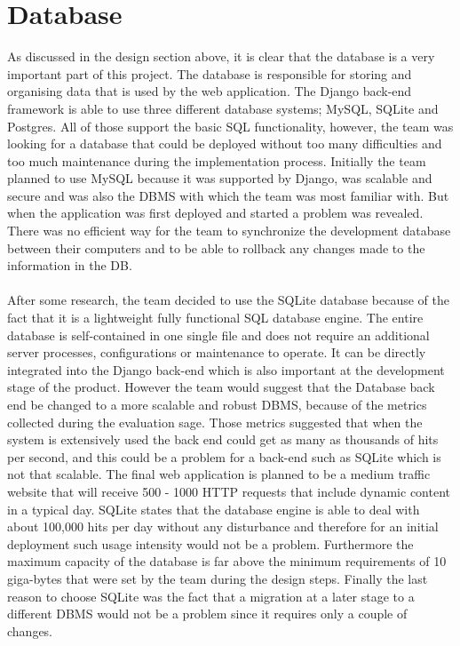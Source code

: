 \documentclass{l3proj}
\begin{document}
\section{Database}
As discussed in the design section above, it is clear that the database is a very important part of this project. The database is responsible for storing and organising data that is used by the web application. The Django back-end framework is able to use three different database systems; MySQL, SQLite and Postgres. All of those support the basic SQL functionality, however, the team was looking for a database that could be deployed without too many difficulties and too much maintenance during the implementation process. Initially the team planned to use MySQL because it was supported by Django, was scalable and secure and was also the DBMS with which the team was most familiar with. But when the application was first deployed and started a problem was revealed. There was no efficient way for the team to synchronize the development database between their computers and to be able to rollback any changes made to the information in the DB.\\
\\After some research, the team decided to use the SQLite database because of the fact that it is a lightweight fully functional SQL database engine. The entire database is self-contained in one single file and does not require an additional server processes, configurations or maintenance to operate. It can be directly integrated into the Django back-end which is also important at the development stage of the product. However the team would suggest that the Database back end be changed to a more scalable and robust DBMS, because of the metrics collected during the evaluation sage. Those metrics suggested that when the system is extensively used the back end could get as many as thousands of hits per second, and this could be a problem for a back-end such as SQLite which is not that scalable. The final web application is planned to be a medium traffic website that will receive 500 - 1000 HTTP requests that include dynamic content in a typical day. SQLite states that the database engine is able to deal with about 100,000 hits per day without any disturbance and therefore for an initial deployment such usage intensity would not be a problem. Furthermore the maximum capacity of the database is far above the minimum requirements of 10 giga-bytes that were set by the team during the design steps. Finally the last reason to choose SQLite was the fact that a migration at a later stage to a different DBMS would not be a problem since it requires only a couple of changes.\\
\end{document}
